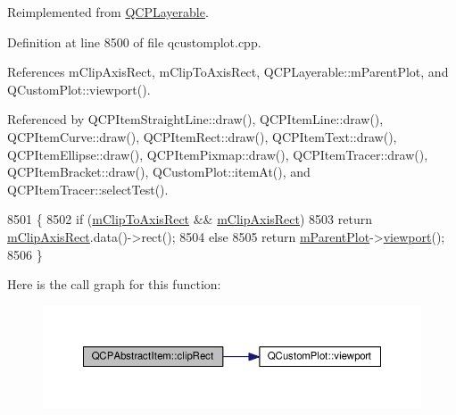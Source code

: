 Reimplemented from \hyperlink{class_q_c_p_layerable_a07a8f746640c3704b09910df297afcba}{Q\+C\+P\+Layerable}.



Definition at line 8500 of file qcustomplot.\+cpp.



References m\+Clip\+Axis\+Rect, m\+Clip\+To\+Axis\+Rect, Q\+C\+P\+Layerable\+::m\+Parent\+Plot, and Q\+Custom\+Plot\+::viewport().



Referenced by Q\+C\+P\+Item\+Straight\+Line\+::draw(), Q\+C\+P\+Item\+Line\+::draw(), Q\+C\+P\+Item\+Curve\+::draw(), Q\+C\+P\+Item\+Rect\+::draw(), Q\+C\+P\+Item\+Text\+::draw(), Q\+C\+P\+Item\+Ellipse\+::draw(), Q\+C\+P\+Item\+Pixmap\+::draw(), Q\+C\+P\+Item\+Tracer\+::draw(), Q\+C\+P\+Item\+Bracket\+::draw(), Q\+Custom\+Plot\+::item\+At(), and Q\+C\+P\+Item\+Tracer\+::select\+Test().


\begin{DoxyCode}
8501 \{
8502   \textcolor{keywordflow}{if} (\hyperlink{class_q_c_p_abstract_item_ad2a70ff6b658fcb84a9427f69d3f587d}{mClipToAxisRect} && \hyperlink{class_q_c_p_abstract_item_a3e57cfe7da4b1ac3d6fa7281ea437361}{mClipAxisRect})
8503     \textcolor{keywordflow}{return} \hyperlink{class_q_c_p_abstract_item_a3e57cfe7da4b1ac3d6fa7281ea437361}{mClipAxisRect}.data()->rect();
8504   \textcolor{keywordflow}{else}
8505     \textcolor{keywordflow}{return} \hyperlink{class_q_c_p_layerable_aa2a528433e44db02b8aef23c1f9f90ed}{mParentPlot}->\hyperlink{class_q_custom_plot_a953ecdbc28018e7e84cb6213ad3d88c2}{viewport}();
8506 \}
\end{DoxyCode}


Here is the call graph for this function\+:\nopagebreak
\begin{figure}[H]
\begin{center}
\leavevmode
\includegraphics[width=350pt]{class_q_c_p_abstract_item_a538e25ff8856534582f5b2b400a46405_cgraph}
\end{center}
\end{figure}




